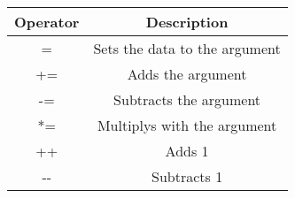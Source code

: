 	\begin{tabular}{c|c}
		\textbf{Operator} & \textbf{Description}\\
		\hline
		=  & Sets the data to the argument\\
		+= & Adds the argument\\
		-= & Subtracts the argument\\
		*= & Multiplys with the argument\\
		++ & Adds 1 \\
		{-}- & Subtracts 1 
	\end{tabular}